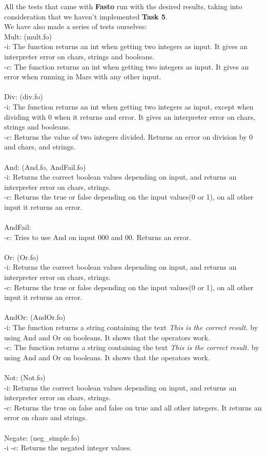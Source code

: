 \documentclass{article}
\begin{document}
All the tests that came with \textbf{Fasto} run with the desired results, taking into consideration that we haven't implemented \textbf{Task 5}.\\
We have also made a series of tests ourselves:
\\
Mult: (mult.fo)\\
-i: The function returns an int when getting two integers as input. It gives an interpreter error on chars, strings and booleans.\\
-c: The function returns an int when getting two integers as input. It gives an error when running in Mars with any other input.\\
\\
Div: (div.fo)\\
-i: The function returns an int when getting two integers as input, except when dividing with 0 when it returns and error. It gives an interpreter error on chars, strings and booleans.\\
-c: Returns the value of two integers divided. Returns an error on division by 0 and chars, and strings.\\
\\
And: (And.fo, AndFail.fo)\\
-i: Returns the correct boolean values depending on input, and returns an interpreter error on chars, strings.\\
-c: Returns the true or false depending on the input values(0 or 1), on all other input it returns an error.\\
\\
AndFail:\\
-c: Tries to use And on input 000 and 00. Returns an error.\\
\\
Or: (Or.fo)\\
-i: Returns the correct boolean values depending on input, and returns an interpreter error on chars, strings.\\
-c: Returns the true or false depending on the input values(0 or 1), on all other input it returns an error.\\
\\
AndOr: (AndOr.fo)\\
-i: The function returns a string containing the text \textit{This is the correct result.} by using And and Or on booleans. It shows that the operators work.\\
-c: The function returns a string containing the text \textit{This is the correct result.} by using And and Or on booleans. It shows that the operators work.\\
\\
Not: (Not.fo)\\
-i: Returns the correct boolean values depending on input, and returns an interpreter error on chars, strings.\\
-c: Returns the true on false and false on true and all other integers. It returns an error on chars and strings.\\
\\
Negate: (neg\_simple.fo)\\
-i -c: Returns the negated integer values.\\
\end{document}
